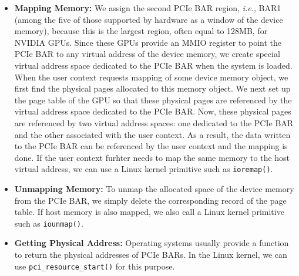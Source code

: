 \begin{itemize}
 \item \textbf{Mapping Memory:}
       We assign the second PCIe BAR region, \textit{i.e.}, BAR1 (among
       the five of those supported by hardware as a window of the device
       memory), because this is the largest region, often equal to 128MB,
       for NVIDIA GPUs.
       Since these GPUs provide an MMIO register to point the PCIe BAR
       to any virtual address of the device 
       memory, we create special virtual address space dedicated to the
       PCIe BAR when the system is loaded.
       When the user context requests mapping of some device memory
       object, we first find the physical pages allocated to this
       memory object.
       We next set up the page table of the GPU so that these
       physical pages are referenced by the virtual address space
       dedicated to the PCIe BAR.
       Now, these physical pages are referenced by two virtual address
       spaces: one dedicated to the PCIe BAR and the other associated
       with the user context.
       As a result, the data written to the PCIe BAR can be referenced
       by the user context and the mapping is done.
       If the user context furhter needs to map the same memory to the
       host virtual address, we can use a Linux kernel primitive such as
       {\tt ioremap()}.
 \item \textbf{Unmapping Memory:}
       To unmap the allocated space of the device memory from the PCIe
       BAR, we simply delete the corresponding record of the page table.
       If host memory is also mapped, we also call a Linux kernel
       primitive such as {\tt iounmap()}.
 \item \textbf{Getting Physical Address:}
       Operating systems usually provide a function to return the physical
       addresses of PCIe BARs.
       In the Linux kernel, we can use {\tt pci\_resource\_start()} for
       this purpose.
\end{itemize}
